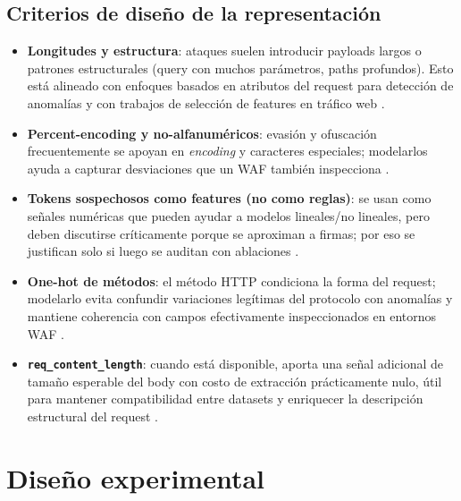 \documentclass[12pt,oneside]{report}
\begin{document}
\section{Criterios de diseño de la representación}
\begin{itemize}[leftmargin=*]
  \item \textbf{Longitudes y estructura}: ataques suelen introducir payloads largos o patrones estructurales (query con muchos parámetros, paths profundos). Esto está alineado con enfoques basados en atributos del request para detección de anomalías y con trabajos de selección de features en tráfico web \cite{kruegel_vigna_2003,riverol_2024}.
  \item \textbf{Percent-encoding y no-alfanuméricos}: evasión y ofuscación frecuentemente se apoyan en \textit{encoding} y caracteres especiales; modelarlos ayuda a capturar desviaciones que un WAF también inspecciona \cite{owasp_waf,modsecurity_site}.
  \item \textbf{Tokens sospechosos como features (no como reglas)}: se usan como señales numéricas que pueden ayudar a modelos lineales/no lineales, pero deben discutirse críticamente porque se aproximan a firmas; por eso se justifican solo si luego se auditan con ablaciones \cite{kruegel_vigna_2003,riverol_2024}.
  \item \textbf{One-hot de métodos}: el método HTTP condiciona la forma del request; modelarlo evita confundir variaciones legítimas del protocolo con anomalías y mantiene coherencia con campos efectivamente inspeccionados en entornos WAF \cite{owasp_waf,modsecurity_site}.
  \item \textbf{\texttt{req\_content\_length}}: cuando está disponible, aporta una señal adicional de tamaño esperable del body con costo de extracción prácticamente nulo, útil para mantener compatibilidad entre datasets y enriquecer la descripción estructural del request \cite{srbh_paper,owasp_waf}.
\end{itemize}

\chapter{Diseño experimental}
\end{document}
